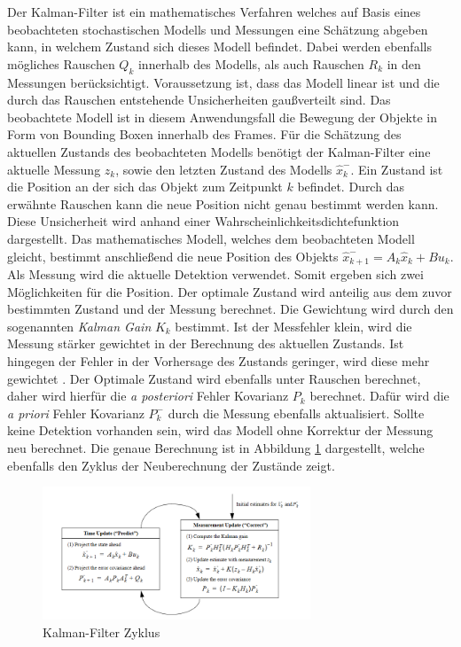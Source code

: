 \documentclass[conference]{IEEEtran}
\begin{document}
	Der Kalman-Filter ist ein mathematisches Verfahren welches auf Basis eines beobachteten stochastischen Modells und Messungen eine Schätzung abgeben kann, in welchem Zustand sich dieses Modell befindet.
	Dabei werden ebenfalls mögliches Rauschen $Q_k$ innerhalb des Modells, als auch Rauschen $R_k$ in den Messungen berücksichtigt. Voraussetzung ist, dass das Modell linear ist und die durch das Rauschen entstehende Unsicherheiten gaußverteilt sind. Das beobachtete Modell ist in diesem Anwendungsfall die Bewegung der Objekte in Form von Bounding Boxen innerhalb des Frames. 
	Für die Schätzung des aktuellen Zustands des beobachteten Modells benötigt der Kalman-Filter eine aktuelle Messung $z_k$, sowie den letzten Zustand des Modells $\hat{x}^{-}_{k}$. 
	Ein Zustand ist die Position an der sich das Objekt zum Zeitpunkt $k$ befindet. Durch das erwähnte Rauschen kann die neue Position nicht genau bestimmt werden kann. Diese Unsicherheit wird anhand einer Wahrscheinlichkeitsdichtefunktion dargestellt. Das mathematisches Modell, welches dem beobachteten Modell gleicht, bestimmt anschließend die neue Position des Objekts $\hat{x}^{-}_{k+1} = A_k \hat{x}_{k}+Bu_k$.
	Als Messung wird die aktuelle Detektion verwendet. Somit ergeben sich zwei Möglichkeiten für die Position.  Der optimale Zustand wird anteilig aus dem zuvor bestimmten Zustand und der Messung berechnet. Die Gewichtung wird durch den sogenannten \textit{Kalman Gain} $K_k$ bestimmt. Ist der Messfehler klein, wird die Messung stärker gewichtet in der Berechnung des aktuellen Zustands. Ist hingegen der Fehler in der Vorhersage des Zustands geringer, wird diese mehr gewichtet \cite{kalman}. Der Optimale Zustand wird ebenfalls unter Rauschen berechnet, daher wird hierfür die \textit{a posteriori} Fehler Kovarianz $P_k$ berechnet. Dafür wird die \textit{a priori} Fehler Kovarianz $P^-_k$ durch die Messung ebenfalls aktualisiert.
	Sollte keine Detektion vorhanden sein, wird das Modell ohne Korrektur der Messung neu berechnet.
	Die genaue Berechnung ist in Abbildung \ref{figure_21} dargestellt, welche ebenfalls den Zyklus der Neuberechnung der Zustände zeigt.
	\begin{figure}[h]
		\begin{center}
			\includegraphics[width=8cm]{Media/kalman.png}
			\caption{Kalman-Filter Zyklus \cite{kalman}}
			\label{figure_21}
		\end{center}
	\end{figure}
	
\end{document}
